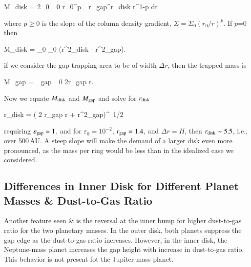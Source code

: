 \documentclass[onecolumn]{report}
\begin{document}
\beq
M_{\rm disk} = 2\pi\varepsilon_0 \varSigma_0 r_0^p \int_{r_{\rm gap}}^{r_{\rm disk}} r^{1-p} dr
\eeq

\noindent where $p \geq 0$ is the slope of the column density gradient,
$\varSigma  = \varSigma_0 (r_0/r)^{p}$. If $p$=0 then

\beq
M_{\rm disk} = \varepsilon_0 \varSigma_0 \pi \left(r^2_{\rm disk} - r^2_{\rm gap}\right).
\eeq

\noindent if we consider the gap trapping area to be of width $\Delta r$, then the
trapped mass is

\beq
M_{\rm gap} = \varepsilon_{\rm gap} \Sigma_0 2\pi r_{\rm gap} \Delta
r.
\eeq

Now we equate $M_{\rm disk}$ and $M_{\rm gap}$ and solve for $r_{\rm disk}$

\beq
r_{\rm disk}  = \left(  2 r_{\rm gap} \Delta r  + r^2_{\rm  gap}\right)^{\
  1/2}
\eeq

\noindent requiring $\varepsilon_{\rm gap} =1$, and for
${\varepsilon_0}=10^{-2}$, $r_{\rm gap}=1.4$, and $\Delta r = H$,
then $r_{\rm disk} \sim 5.5$, i.e., over 500\,AU. A steep slope will
make the demand of a larger disk even more pronounced, as the mass per ring would be less
than in the idealized case we considered.

\subsection{Differences in Inner Disk for Different Planet Masses \& Dust-to-Gas Ratio}

Another feature seen  \&  is the reversal at the inner bump for higher dust-to-gas ratio for the two planetary masses. In the outer disk, both planets suppress the gap edge as the dust-to-gas ratio increases. However, in the inner disk, the Neptune-mass planet increases the gap height with increase in dust-to-gas ratio. This behavior is not present fot the Jupiter-mass planet.\par
\end{document}
